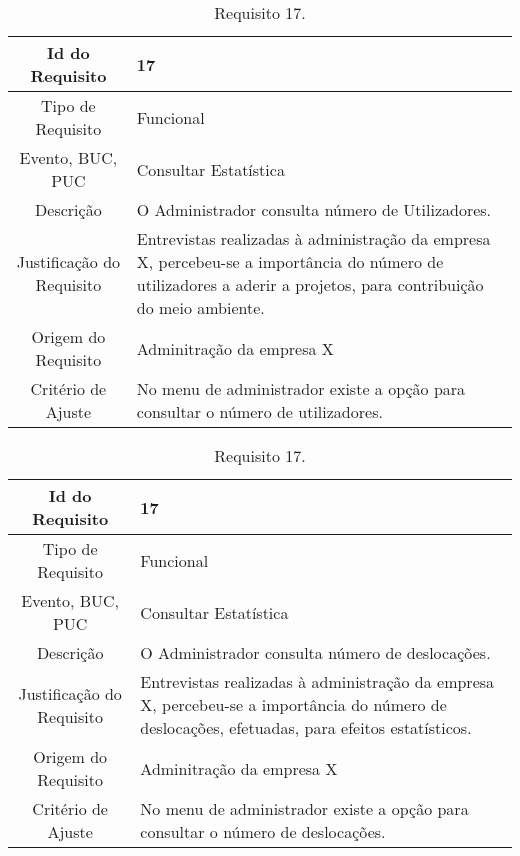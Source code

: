 \begin{table}[H]
\begin{center}
  \begin{tabularx}{\textwidth}{ | c | X | }
    \hline
    Id do Requisito & 17  \\
    
    \hline
    Tipo de Requisito & Funcional \\
    
    \hline
    Evento, BUC, PUC &  Consultar Estatística\\
    
    \hline
    Descrição & O Administrador consulta número de Utilizadores.\\
    
    \hline
    Justificação do Requisito & Entrevistas realizadas à administração da empresa X, percebeu-se a importância do número de utilizadores a aderir a projetos, para contribuição do meio ambiente. \\
    
    \hline
    Origem do Requisito & Adminitração da empresa X\\
    
    \hline
    Critério de Ajuste & No menu de administrador existe a opção para consultar o número de utilizadores.  \\
    
    \hline
  \end{tabularx}
  \caption{Requisito 17.} \label{tab:r3}
\end{center}
\end{table}

\begin{table}[H]
\begin{center}
  \begin{tabularx}{\textwidth}{ | c | X | }
    \hline
    Id do Requisito & 17  \\
    
    \hline
    Tipo de Requisito & Funcional \\
    
    \hline
    Evento, BUC, PUC &  Consultar Estatística\\
    
    \hline
    Descrição & O Administrador consulta número de deslocações.\\
    
    \hline
    Justificação do Requisito & Entrevistas realizadas à administração da empresa X, percebeu-se a importância do número de deslocações, efetuadas, para efeitos estatísticos. \\
    
    \hline
    Origem do Requisito & Adminitração da empresa X\\
    
    \hline
    Critério de Ajuste & No menu de administrador existe a opção para consultar o número de deslocações.  \\
    
    \hline
  \end{tabularx}
  \caption{Requisito 17.} \label{tab:r3}
\end{center}
\end{table}

